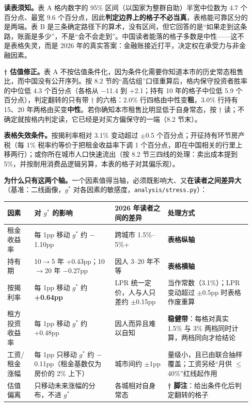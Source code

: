 \documentclass[11pt,a4paper]{ctexart}
\begin{document}
\textbf{读表须知。}表 A 格内数字的 95\% 区间（以国家为整群自助）半宽中位数为 4.7 个百分点、最宽 9.6 个百分点，因此\textbf{判定边界上的格子不必当真}，表格能可靠区分的是两端。表 B 是三条确定路径下的算术，没有区间，但它回答的是``如果走到这条路，账面是多少''，不是``会不会走到''。中国读者能落的格子多数是中性——这不是表格失灵，而是 2026 年的真实答案：金融账接近打平，决定权在承受力与非金融因素。

\textbf{† 估值修正。}表 A 不按估值条件化，因为条件化需要你知道本市的历史常态租售比，而中国没有公开序列。按 8.2 节的``高估组''口径重算后，格内保守投资者胜率的中位低 4.3 个百分点（各格从 $-$11.4 到 +2.1；持有 10 年的格子中位低 5.9 个百分点），判定翻转的只有带 † 的六格：2.0\% 行四格由中性变\textbf{租}，3.0\% 行持有 15、20 年两格由买变\textbf{中性}。若你确知本市租售比明显低于自身常态，按 † 读；不确定就按格内判定读，它已经是对买方偏保守的一端（8.2 节末）。

\textbf{表格失效条件。}按揭利率相对 3.1\% 变动超过 $\pm$0.5 个百分点；开征持有环节房产税（每 1\% 税率约等价于把租金收益率下调 1 个百分点，即在中国相关的行里上移两行）；或你所在城市人口快速流出（按 8.2 节三四线的处理：卖出成本提到 5\%，并按耐用消费品逻辑另算，本表的格子对其偏乐观）。

\textbf{为什么只有这两个轴。}一个因素值得当轴，必须既影响大、又\textbf{在读者之间差异大}（基准：二线画像，$g^*$ 对各因素的敏感度，\texttt{analysis/stress.py}）：

\begin{table}[H]\centering\footnotesize
\begin{tabularx}{\textwidth}{lXXX}
\toprule
因素 & 对 $g^*$ 的影响 & 2026 年读者之间的差异 & 处理方式 \\
\midrule
租金收益率 & 每 1pp 移动 $g^*$ 约 $-$1.10pp & 跨城市 1.5\%--5\%+ & \textbf{表格纵轴} \\
持有期 & 10$\to$5 年 +0.43pp；10$\to$20 年 $-$0.27pp & 因人 3--20 年不等 & \textbf{表格横轴} \\
按揭利率 & 每 1pp 移动 $g^*$ 约 \textbf{+0.64pp} & LPR 统一定价，人与人只差约 $\pm$0.15pp & 当作常数（3.1\%）；LPR 变动超过 $\pm$0.5pp 时表格作废重算 \\
租方投资收益率 & 每 1pp 移动 $g^*$ 约 +0.48pp & 因人而异且难以自知 & \textbf{稳健带}：每格对真实 1.5\% 与 3\% 两档同时计算，两档同向才给结论 \\
工资/租金涨幅 & 每 1pp 只移动 $g^*$ 约 $-$0.11pp（租金基数仅为房价的 2\% 上下） & 城市间约 $\pm$1pp & 量级小，且已由联合抽样覆盖；工资另经``月供 $\leq$40\%''红线起作用 \\
估值偏离 & 只移动未来涨幅的分布，不进 $g^*$ & 各城相对自身常态 & \textbf{† 脚注}：给出条件化后判定翻转的格子 \\
\bottomrule
\end{tabularx}
\end{table}
\end{document}

